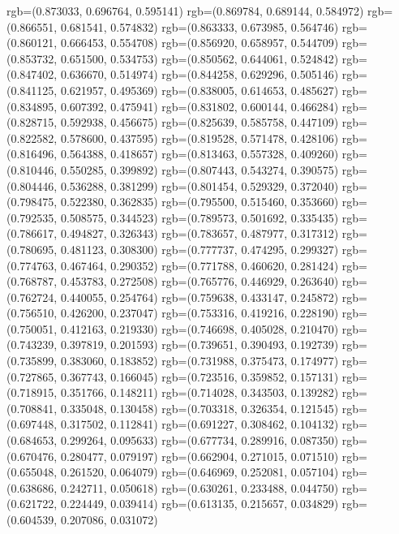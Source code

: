 {{{					rgb=(0.873033, 0.696764, 0.595141)
					rgb=(0.869784, 0.689144, 0.584972)
					rgb=(0.866551, 0.681541, 0.574832)
					rgb=(0.863333, 0.673985, 0.564746)
					rgb=(0.860121, 0.666453, 0.554708)
					rgb=(0.856920, 0.658957, 0.544709)
					rgb=(0.853732, 0.651500, 0.534753)
					rgb=(0.850562, 0.644061, 0.524842)
					rgb=(0.847402, 0.636670, 0.514974)
					rgb=(0.844258, 0.629296, 0.505146)
					rgb=(0.841125, 0.621957, 0.495369)
					rgb=(0.838005, 0.614653, 0.485627)
					rgb=(0.834895, 0.607392, 0.475941)
					rgb=(0.831802, 0.600144, 0.466284)
					rgb=(0.828715, 0.592938, 0.456675)
					rgb=(0.825639, 0.585758, 0.447109)
					rgb=(0.822582, 0.578600, 0.437595)
					rgb=(0.819528, 0.571478, 0.428106)
					rgb=(0.816496, 0.564388, 0.418657)
					rgb=(0.813463, 0.557328, 0.409260)
					rgb=(0.810446, 0.550285, 0.399892)
					rgb=(0.807443, 0.543274, 0.390575)
					rgb=(0.804446, 0.536288, 0.381299)
					rgb=(0.801454, 0.529329, 0.372040)
					rgb=(0.798475, 0.522380, 0.362835)
					rgb=(0.795500, 0.515460, 0.353660)
					rgb=(0.792535, 0.508575, 0.344523)
					rgb=(0.789573, 0.501692, 0.335435)
					rgb=(0.786617, 0.494827, 0.326343)
					rgb=(0.783657, 0.487977, 0.317312)
					rgb=(0.780695, 0.481123, 0.308300)
					rgb=(0.777737, 0.474295, 0.299327)
					rgb=(0.774763, 0.467464, 0.290352)
					rgb=(0.771788, 0.460620, 0.281424)
					rgb=(0.768787, 0.453783, 0.272508)
					rgb=(0.765776, 0.446929, 0.263640)
					rgb=(0.762724, 0.440055, 0.254764)
					rgb=(0.759638, 0.433147, 0.245872)
					rgb=(0.756510, 0.426200, 0.237047)
					rgb=(0.753316, 0.419216, 0.228190)
					rgb=(0.750051, 0.412163, 0.219330)
					rgb=(0.746698, 0.405028, 0.210470)
					rgb=(0.743239, 0.397819, 0.201593)
					rgb=(0.739651, 0.390493, 0.192739)
					rgb=(0.735899, 0.383060, 0.183852)
					rgb=(0.731988, 0.375473, 0.174977)
					rgb=(0.727865, 0.367743, 0.166045)
					rgb=(0.723516, 0.359852, 0.157131)
					rgb=(0.718915, 0.351766, 0.148211)
					rgb=(0.714028, 0.343503, 0.139282)
					rgb=(0.708841, 0.335048, 0.130458)
					rgb=(0.703318, 0.326354, 0.121545)
					rgb=(0.697448, 0.317502, 0.112841)
					rgb=(0.691227, 0.308462, 0.104132)
					rgb=(0.684653, 0.299264, 0.095633)
					rgb=(0.677734, 0.289916, 0.087350)
					rgb=(0.670476, 0.280477, 0.079197)
					rgb=(0.662904, 0.271015, 0.071510)
					rgb=(0.655048, 0.261520, 0.064079)
					rgb=(0.646969, 0.252081, 0.057104)
					rgb=(0.638686, 0.242711, 0.050618)
					rgb=(0.630261, 0.233488, 0.044750)
					rgb=(0.621722, 0.224449, 0.039414)
					rgb=(0.613135, 0.215657, 0.034829)
					rgb=(0.604539, 0.207086, 0.031072)
}}}

